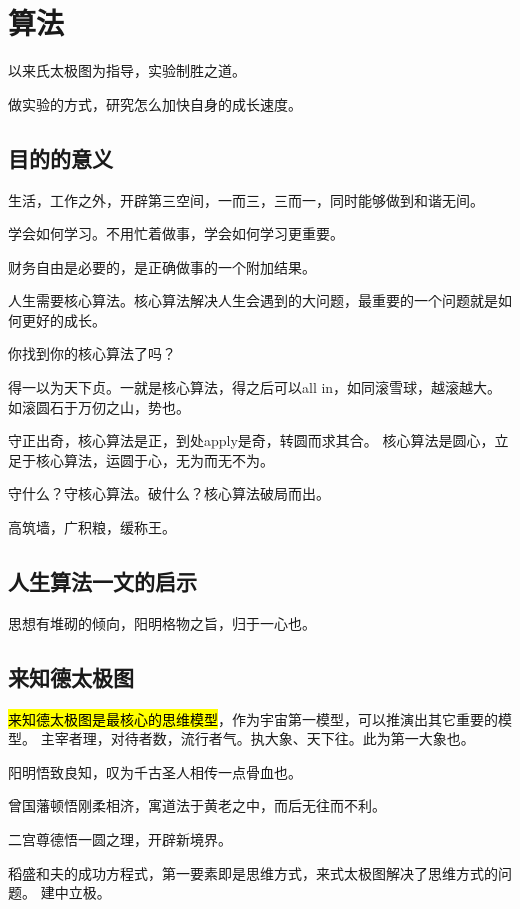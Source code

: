 \chapter{算法}

以来氏太极图为指导，实验制胜之道。

做实验的方式，研究怎么加快自身的成长速度。

\section{目的的意义}

生活，工作之外，开辟第三空间，一而三，三而一，同时能够做到和谐无间。

学会如何学习。不用忙着做事，学会如何学习更重要。

财务自由是必要的，是正确做事的一个附加结果。


人生需要核心算法。核心算法解决人生会遇到的大问题，最重要的一个问题就是如何更好的成长。

你找到你的核心算法了吗？

得一以为天下贞。一就是核心算法，得之后可以all in，如同滚雪球，越滚越大。
如滚圆石于万仞之山，势也。

守正出奇，核心算法是正，到处apply是奇，转圆而求其合。
核心算法是圆心，立足于核心算法，运圆于心，无为而无不为。

守什么？守核心算法。破什么？核心算法破局而出。

高筑墙，广积粮，缓称王。

\section{人生算法一文的启示}

思想有堆砌的倾向，阳明格物之旨，归于一心也。

\section{来知德太极图}

\hl{来知德太极图是最核心的思维模型}，作为宇宙第一模型，可以推演出其它重要的模型。
主宰者理，对待者数，流行者气。执大象、天下往。此为第一大象也。

阳明悟致良知，叹为千古圣人相传一点骨血也。

曾国藩顿悟刚柔相济，寓道法于黄老之中，而后无往而不利。

二宫尊德悟一圆之理，开辟新境界。

稻盛和夫的成功方程式，第一要素即是思维方式，来式太极图解决了思维方式的问题。
建中立极。

